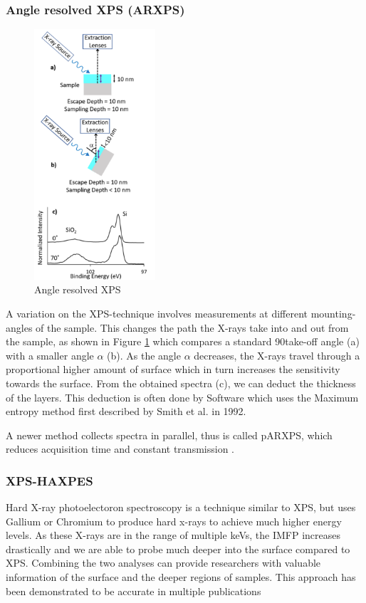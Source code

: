 \subsubsection{Angle resolved XPS (ARXPS)}
\begin{figure}
    \centering
    \includegraphics[width=0.4\textwidth]{Figures/ARXPS.png}
    \caption{Angle resolved XPS \cite{stevie_introduction_2020}}
    \label{fig:arxps}
\end{figure}
A variation on the XPS-technique involves measurements at different mounting-angles of the sample.
This changes the path the X-rays take into and out from the sample, as shown in Figure \ref{fig:arxps} which compares a standard 90\textdegree  take-off angle (a) with a smaller angle $\alpha$ (b). As the angle $\alpha$ decreases, the X-rays travel through a proportional higher amount of surface which in turn increases the sensitivity towards the surface. From the obtained spectra (c), we can deduct the thickness of the layers. This deduction is often done by Software which uses the Maximum entropy method first described by Smith et al. \cite{smith_maximum_1992} in 1992.

A newer method collects spectra in parallel, thus is called pARXPS, which reduces acquisition time and constant transmission \cite{bure_assessing_2023}.

\subsubsection{XPS-HAXPES}

Hard X-ray photoelectoron spectroscopy is a technique similar to XPS, but uses Gallium or Chromium to produce hard x-rays to achieve much higher energy levels. As these X-rays are in the range of multiple keVs, the IMFP increases drastically and we are able to probe much deeper into the surface compared to XPS. Combining the two analyses can provide researchers with valuable information of the surface and the deeper regions of samples. This approach has been demonstrated to be accurate in multiple publications \cite{bure_assessing_2023, siol_concepts_2020} 